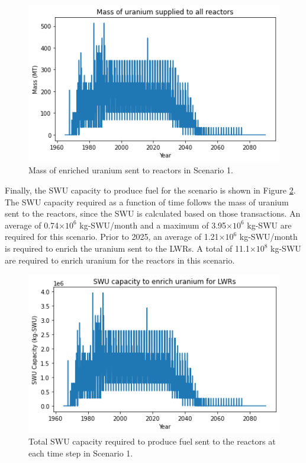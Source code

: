 \begin{figure}
    \centering 
    \includegraphics[width=\textwidth]{../figures/fuelsupply_scenarios_1.png}
    \caption{Mass of enriched uranium sent to reactors in Scenario 1.}
    \label{fig:fuel_1}
\end{figure}

Finally, the \gls{SWU} capacity to produce fuel for the scenario is shown in 
Figure \ref{fig:swu_1}. The \gls{SWU} capacity required as a function of 
time follows the mass of uranium sent to the reactors, since the \gls{SWU}
is calculated based on those transactions. An average of 0.74$\times 10^6$
kg-\gls{SWU}/month and a maximum of 3.95$\times 10^6$ kg-\gls{SWU} are 
required for this scenario. Prior to 2025, an average of 1.21$\times 10^6$ 
kg-\gls{SWU}/month is required to enrich the uranium sent to the \glspl{LWR}.
A total of 11.1$\times 10^8$ kg-SWU are required to enrich uranium for the 
reactors in this scenario.

\begin{figure}
    \centering
    \includegraphics[width=\textwidth]{../figures/totalswu_scenarios_1.png}
    \caption{Total \gls{SWU} capacity required to produce fuel sent to the 
    reactors at each time step in Scenario 1.}
    \label{fig:swu_1}
\end{figure}

